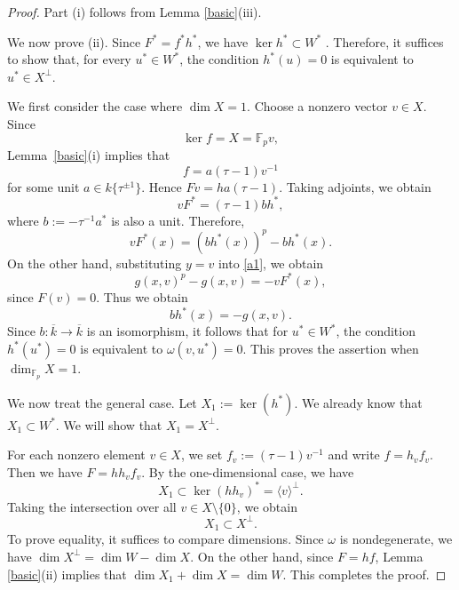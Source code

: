 \documentclass[12pt,a4paper]{amsart}
\theoremstyle{definition}
\def\F{{\mathbb F}}
\theoremstyle{remark}
\begin{document}
\begin{proof}
Part (i) follows from Lemma \ref{basic}(iii). 

We now prove (ii). Since $F^\ast=f^\ast h^\ast$, we have $\ker h^\ast\subset W^\ast$ . Therefore, it suffices to show that, for every $u^\ast\in W^\ast$, the condition $h^\ast(u)=0$ is equivalent to $u^\ast\in X^\perp$. 

We first consider the case where $\dim X=1$. Choose a nonzero vector $v\in X$. Since 
\[\ker f=X=\F_p  v,\]
Lemma~\ref{basic}\textup{(i)} implies that
\[
f=a(\tau-1)v^{-1}
\]
for some unit $a\in k\{\tau^{\pm1}\}$. Hence $Fv=ha(\tau-1)$.  Taking adjoints, we obtain 
\[vF^\ast=(\tau-1)bh^\ast,\]
where $b:=-\tau^{-1}a^\ast$ is also a unit. Therefore,  
\[vF^\ast(x)=(bh^\ast(x))^p-bh^\ast(x). \]
On the other hand, substituting $y=v$ into \eqref{a1}, we obtain
\[
g(x,v)^p-g(x,v)
=
-vF^\ast(x),
\]
since $F(v)=0$. Thus we obtain 
\[
bh^\ast(x)=-g(x,v).
\]
Since $b\colon \overline{k}\to \overline{k}$ is an isomorphism, it follows that for $u^\ast\in W^\ast$, the condition $h^\ast(u^\ast)=0$ is equivalent to $\omega(v,u^\ast)=0$. This proves the assertion when $\dim_{\F_p} X=1$. 


\medskip 

\noindent
We now treat the general case. Let $X_1:=\ker(h^\ast)$. We already know that $X_1\subset W^\ast$. We will show that $X_1=X^\perp$. 

For each nonzero element $v\in X$, we set $f_v:=(\tau-1)v^{-1}$ and write $f=h_vf_v$. Then we have $F=hh_vf_v$. By the one-dimensional case, we have 
\[X_1\subset \ker (hh_v)^\ast=\langle v\rangle^\perp.\]
Taking the intersection over all $v\in X\setminus\{0\}$, 
we obtain
\[
X_1\subset X^\perp.
\]
To prove equality, it suffices to compare dimensions.
Since $\omega$ is nondegenerate, we have $\dim X^\perp=\dim W-\dim X$. On the other hand, since $F=hf$, Lemma \ref{basic}(ii) implies that $\dim X_1+\dim X=\dim W$. This completes the proof.
\end{proof}
\end{document}
